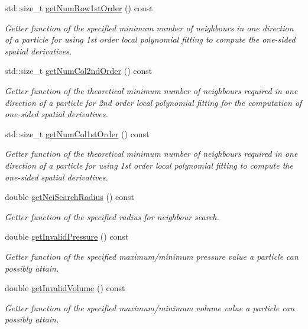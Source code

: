 \begin{DoxyCompactItemize}
std\-::size\-\_\-t \hyperlink{classInitializer_a50c331f21050b50e4f4d0dee113ac69d}{get\-Num\-Row1st\-Order} () const 
\begin{DoxyCompactList}\small\item\em Getter function of the specified minimum number of neighbours in one direction of a particle for using 1st order local polynomial fitting to compute the one-\/sided spatial derivatives. \end{DoxyCompactList}\item 
std\-::size\-\_\-t \hyperlink{classInitializer_a6e605410501b5ae0295cc27b80fa76d0}{get\-Num\-Col2nd\-Order} () const 
\begin{DoxyCompactList}\small\item\em Getter function of the theoretical minimum number of neighbours required in one direction of a particle for 2nd order local polynomial fitting for the computation of one-\/sided spatial derivatives. \end{DoxyCompactList}\item 
std\-::size\-\_\-t \hyperlink{classInitializer_af0098f9d59ac38ca48e19759f2c4b6a5}{get\-Num\-Col1st\-Order} () const 
\begin{DoxyCompactList}\small\item\em Getter function of the theoretical minimum number of neighbours required in one direction of a particle for using 1st order local polynomial fitting to compute the one-\/sided spatial derivatives. \end{DoxyCompactList}\item 
double \hyperlink{classInitializer_ad2c591d1796c255cb62c0e90c5c0a875}{get\-Nei\-Search\-Radius} () const 
\begin{DoxyCompactList}\small\item\em Getter function of the specified radius for neighbour search. \end{DoxyCompactList}\item 
double \hyperlink{classInitializer_a9607400f0e0115fb7b677423403e2144}{get\-Invalid\-Pressure} () const 
\begin{DoxyCompactList}\small\item\em Getter function of the specified maximum/minimum pressure value a particle can possibly attain. \end{DoxyCompactList}\item 
double \hyperlink{classInitializer_a007b62d5ce2c5f19bf1bd379498ef64b}{get\-Invalid\-Volume} () const 
\begin{DoxyCompactList}\small\item\em Getter function of the specified maximum/minimum volume value a particle can possibly attain. \end{DoxyCompactList}\item 

\end{DoxyCompactItemize}
